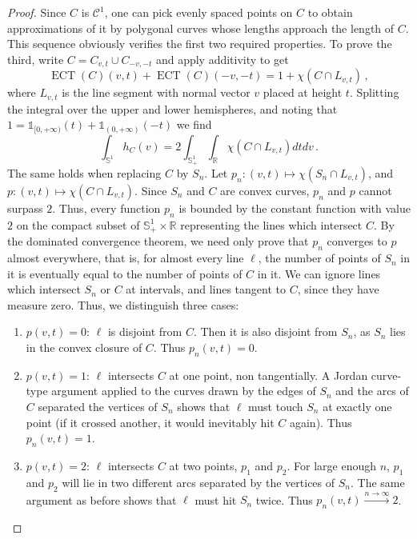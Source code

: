 \documentclass[a4paper]{article}
\newcommand{\ECT}{\operatorname{ECT}}
\newcommand{\bb}{\mathbb}
\begin{document}
\begin{proof}
	Since $C$ is $\mathcal C^1$, one can pick evenly spaced points on $C$ to obtain approximations of it by polygonal curves whose lengths approach the length of $C$. This sequence obviously verifies the first two required properties. To prove the third, write $C= C_{v,t} \cup C_{-v,-t}$ and apply additivity to get \[\ECT(C)(v,t)+\ECT(C)(-v,-t)=1+\chi(C \cap L_{v,t})\, ,\]
	where $L_{v,t}$ is the line segment with normal vector $v$ placed at height $t$. Splitting the integral over the upper and lower hemispheres, and noting that $1=\bb 1_{[0, +\infty)}(t)+\bb 1_{(0, +\infty)}(-t)$ we find
	\[ \int_{\bb S^{1}} h_C(v) = 2 \int_{\bb S^{1}_+} \int_{\bb R} \chi(C \cap L_{v,t}) dt dv\, . \]
	The same holds when replacing $C$ by $S_n$. Let $p_n: (v, t) \mapsto \chi(S_n \cap L_{v,t})$, and $p: (v,t) \mapsto \chi(C \cap L_{v,t})$. Since $S_n$ and $C$ are convex curves, $p_n$ and $p$ cannot surpass $2$. Thus, every function $p_n$ is bounded by the constant function with value $2$ on the compact subset of $\bb S^1_+ \times \bb R$ representing the lines which intersect $C$. By the dominated convergence theorem, we need only prove that $p_n$ converges to $p$ almost everywhere, that is, for almost every line $\ell$, the number of points of $S_n$ in it is eventually equal to the number of points of $C$ in it. We can ignore lines which intersect $S_n$ or $C$ at intervals, and lines tangent to $C$, since they have measure zero. Thus, we distinguish three cases:
	\begin{enumerate}
		\item $p(v,t)=0$: $\ell$ is disjoint from $C$. Then it is also disjoint from $S_n$, as $S_n$ lies in the convex closure of $C$. Thus $p_n(v,t)=0$.
		\item $p(v,t)=1$: $\ell$ intersects $C$ at one point, non tangentially. A Jordan curve-type argument applied to the curves drawn by the edges of $S_n$ and the arcs of $C$ separated the vertices of $S_n$ shows that $\ell$ must touch $S_n$ at exactly one point (if it crossed another, it would inevitably hit $C$ again). Thus $p_n(v,t)=1$.
		\item $p(v,t)=2$: $\ell$ intersects $C$ at two points, $p_1$ and $p_2$. For large enough $n$, $p_1$ and $p_2$ will lie in two different arcs separated by the vertices of $S_n$. The same argument as before shows that $\ell$ must hit $S_n$ twice. Thus $p_n(v,t) \overset{n \to \infty}{\longrightarrow} 2$.\qedhere
	\end{enumerate}
\end{proof}
\end{document}
